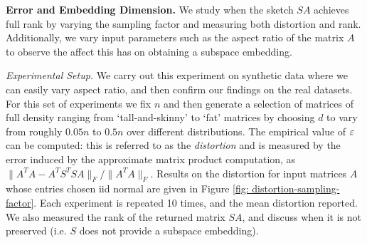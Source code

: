 \medskip
\noindent\textbf{Error and Embedding Dimension.}
We study when the sketch $SA$ achieves full rank by varying the sampling factor
and measuring both distortion and rank.
Additionally, we vary input
parameters such as the aspect ratio of the matrix $A$ to observe the affect this
has on obtaining a subspace embedding.


\noindent
\textit{Experimental Setup.}
We carry out this experiment on synthetic data where we can easily
vary aspect ratio, and then confirm our findings on the real
datasets.
For this set of experiments we fix $n$ and then generate a selection of matrices
of full density
ranging from `tall-and-skinny' to `fat' matrices by choosing $d$ to vary
from roughly $0.05n$ to $0.5n$ over different distributions.
The empirical value of $\varepsilon$ can be computed: this is referred to as the
\textit{distortion} and is measured by the error induced by the approximate matrix product
computation, as $\|A^T A - A^T S^T S A \|_F/\|A^TA\|_F$.
Results on the distortion for input matrices $A$ whose entries chosen iid normal are given
in Figure \ref{fig: distortion-sampling-factor}.
Each experiment is repeated 10 times, and the mean distortion reported.
We also measured the rank of the returned matrix $SA$, and discuss
when it is not preserved (i.e. $S$ does not provide a subspace
embedding).


